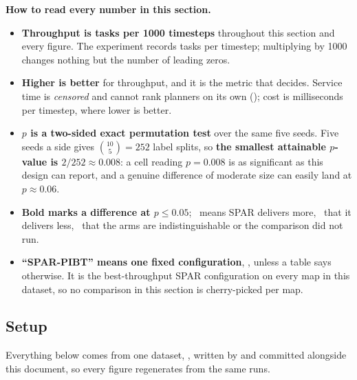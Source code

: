 \begin{caveat}
\textbf{How to read every number in this section.}
\begin{itemize}[leftmargin=1.2em]
\item \textbf{Throughput is tasks per 1000 timesteps} throughout this section
  and every figure. The experiment records tasks per timestep; multiplying by
  1000 changes nothing but the number of leading zeros.
\item \textbf{Higher is better} for throughput, and it is the metric that
  decides. Service time is \emph{censored} and cannot rank planners on its own
  (); cost is milliseconds per timestep, where lower is
  better.
\item \textbf{$p$ is a two-sided exact permutation test} over the same five
  seeds. Five seeds a side gives $\binom{10}{5} = 252$ label splits, so
  \textbf{the smallest attainable $p$-value is $2/252 \approx 0.008$}: a cell
  reading $p = 0.008$ is as significant as this design can report, and a
  genuine difference of moderate size can easily land at $p \approx 0.06$.
\item \textbf{Bold marks a difference at $p \leq 0.05$}; \wins\ means SPAR
  delivers more, \loses\ that it delivers less, \unclear\ that the arms are
  indistinguishable or the comparison did not run.
\item \textbf{``SPAR-PIBT'' means one fixed configuration},
  , unless a table says otherwise. It is the
  best-throughput SPAR configuration on every map in this dataset, so no
  comparison in this section is cherry-picked per map.
\end{itemize}
\end{caveat}

\subsection{Setup}

Everything below comes from one dataset, , written by
 and committed alongside this document, so every
figure regenerates from the same runs.

